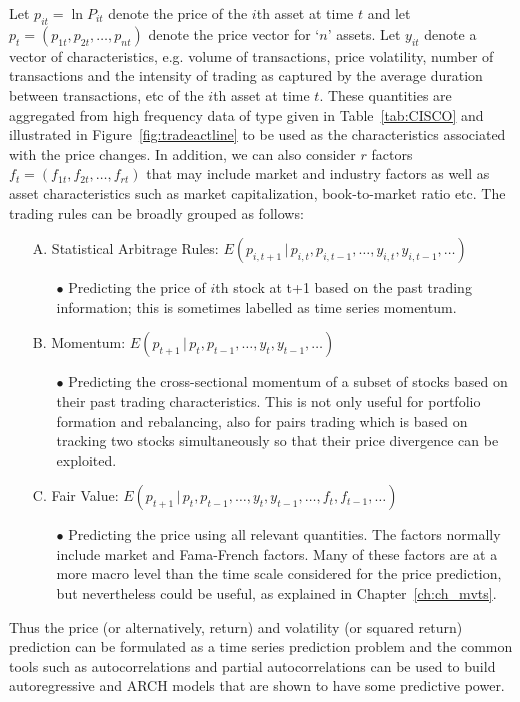 Let $p_{it}= \ln P_{it}$ denote the price of the $i$th asset at time $t$ and let $p_t = (p_{1t}, p_{2t}, \ldots, p_{nt})$ denote the price vector for `$n$' assets. Let $y_{it}$ denote a vector of characteristics, e.g. volume of transactions, price volatility, number of transactions and the intensity of trading as captured by the average duration between transactions, etc of the $i$th asset at time $t$. These quantities are aggregated from high frequency data of type given in Table~\ref{tab:CISCO} and illustrated in Figure~\ref{fig:tradeactline} to be used as the characteristics associated with the price changes. In addition, we can also consider $r$ factors $f_t = (f_{1t}, f_{2t}, \ldots, f_{rt})$ that may include market and industry factors as well as asset characteristics such as market capitalization, book-to-market ratio etc. The trading rules can be broadly grouped as follows:
        \begin{itemize}
        \item[A.] Statistical Arbitrage Rules: $E(p_{i,t+1}\,|\,p_{i,t},p_{i,t-1},\ldots,y_{i,t},y_{i,t-1},\ldots)$
        \begin{itemize}
        \item[$\bullet$] Predicting the price of $i$th stock at t+1 based on the past trading information; this is sometimes labelled as time series momentum.
        \end{itemize}
        \item[B.] Momentum: $E(p_{t+1}\,|\,p_{t},p_{t-1},\ldots,y_{t},y_{t-1},\ldots)$
        \begin{itemize}
        \item[$\bullet$] Predicting the cross-sectional momentum of a subset of stocks based on their past trading characteristics. This is not only useful for portfolio formation and rebalancing, also for pairs trading which is based on tracking two stocks simultaneously so that their price divergence can be exploited. 
        \end{itemize}
        \item[C.] Fair Value: $E(p_{t+1}\,|\,p_{t},p_{t-1},\ldots,y_{t},y_{t-1},\ldots,f_t,f_{t-1},\ldots)$
        \begin{itemize}
        \item[$\bullet$] Predicting the price using all relevant quantities. The factors normally include market and Fama-French factors. Many of these factors are at a more macro level than the time scale considered for the price prediction, but nevertheless could be useful, as explained in Chapter~\ref{ch:ch_mvts}.
        \end{itemize}
        \end{itemize}
\noindent Thus the price (or alternatively, return) and volatility (or squared return) prediction can be formulated as a time series prediction problem and the common tools such as autocorrelations and partial autocorrelations can be used to build autoregressive and ARCH models that are shown to have some predictive power. 



